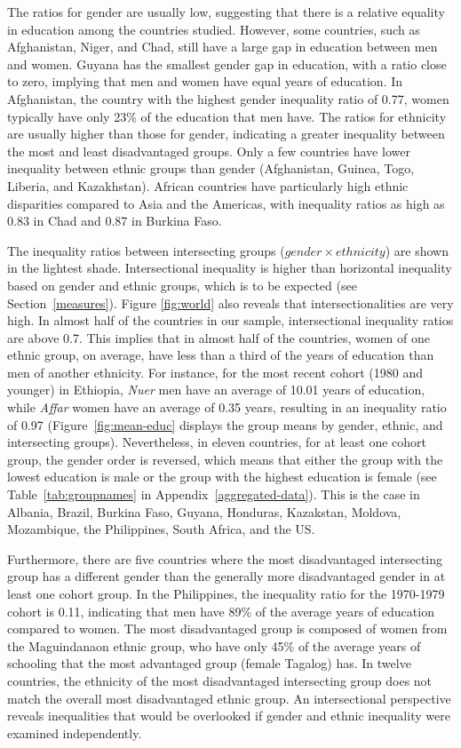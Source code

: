 The ratios for gender are usually low, suggesting that there is a relative equality in education among the countries studied. However, some countries, such as Afghanistan, Niger, and Chad, still have a large gap in education between men and women. Guyana has the smallest gender gap in education, with a ratio close to zero, implying that men and women have equal years of education. In Afghanistan, the country with the highest gender inequality ratio of 0.77, women typically have only 23\% of the education that men have. The ratios for ethnicity are usually higher than those for gender, indicating a greater inequality between the most and least disadvantaged groups. Only a few countries have lower inequality between ethnic groups than gender (Afghanistan, Guinea, Togo, Liberia, and Kazakhstan). African countries have particularly high ethnic disparities compared to Asia and the Americas, with inequality ratios as high as 0.83 in Chad and 0.87 in Burkina Faso. 

The inequality ratios between intersecting groups ($gender \times ethnicity$) are shown in the lightest shade. Intersectional inequality is higher than horizontal inequality based on gender and ethnic groups, which is to be expected (see Section~\ref{measures}). Figure \ref{fig:world} also reveals that intersectionalities are very high. In almost half of the countries in our sample, intersectional inequality ratios are above 0.7. This implies that in almost half of the countries, women of one ethnic group, on average, have less than a third of the years of education than men of another ethnicity. For instance, for the most recent cohort (1980 and younger) in Ethiopia, \textit{Nuer} men have an average of 10.01 years of education, while \textit{Affar} women have an average of 0.35 years, resulting in an inequality ratio of 0.97 (Figure~\ref{fig:mean-educ} displays the group means by gender, ethnic, and intersecting groups). Nevertheless, in eleven countries, for at least one cohort group, the gender order is reversed, which means that either the group with the lowest education is male or the group with the highest education is female (see Table~\ref{tab:groupnames} in Appendix~\ref{aggregated-data}). This is the case in Albania, Brazil, Burkina Faso, Guyana, Honduras, Kazakstan, Moldova, Mozambique, the Philippines, South Africa, and the US.

Furthermore, there are five countries where the most disadvantaged intersecting group has a different gender than the generally more disadvantaged gender in at least one cohort group. In the Philippines, the inequality ratio for the 1970-1979 cohort is 0.11, indicating that men have 89\% of the average years of education compared to women. The most disadvantaged group is composed of women from the Maguindanaon ethnic group, who have only 45\% of the average years of schooling that the most advantaged group (female Tagalog) has. In twelve countries, the ethnicity of the most disadvantaged intersecting group does not match the overall most disadvantaged ethnic group. An intersectional perspective reveals inequalities that would be overlooked if gender and ethnic inequality were examined independently.

